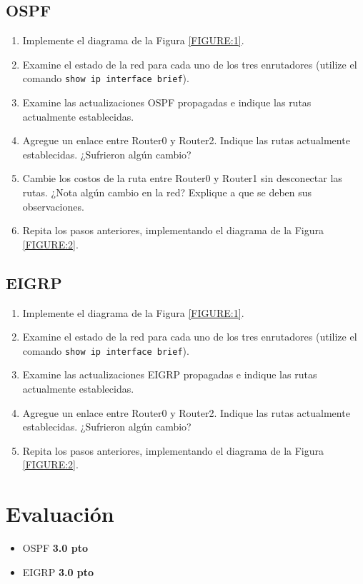 \documentclass[11pt]{utalcaDoc}
\begin{document}
\subsection{OSPF}
\begin{enumerate}
  \item {Implemente el diagrama de la Figura \ref{FIGURE:1}.}
  \item {Examine el estado de la red para cada uno de los tres enrutadores (utilize el comando \texttt{show ip interface brief}).}
  \item Examine las actualizaciones OSPF propagadas e indique las rutas actualmente establecidas.
  \item Agregue un enlace entre Router0 y Router2. Indique las rutas actualmente establecidas. ¿Sufrieron algún cambio?
  \item Cambie los costos de la ruta entre Router0 y Router1 sin desconectar las rutas. ¿Nota algún cambio en la red? Explique a que se deben sus observaciones.
  \item {Repita los pasos anteriores, implementando el diagrama de la Figura \ref{FIGURE:2}.}
\end{enumerate}

\subsection{EIGRP}
\begin{enumerate}
  \item {Implemente el diagrama de la Figura \ref{FIGURE:1}.}
  \item {Examine el estado de la red para cada uno de los tres enrutadores (utilize el comando \texttt{show ip interface brief}).}
  \item Examine las actualizaciones EIGRP propagadas e indique las rutas actualmente establecidas.
  \item Agregue un enlace entre Router0 y Router2. Indique las rutas actualmente establecidas. ¿Sufrieron algún cambio?
  \item {Repita los pasos anteriores, implementando el diagrama de la Figura \ref{FIGURE:2}.}
\end{enumerate}


\section{Evaluación}
\begin{itemize}
  \item{OSPF \textbf{3.0 pto}}
  \item{EIGRP \textbf{3.0 pto}}
\end{itemize}
\end{document}
